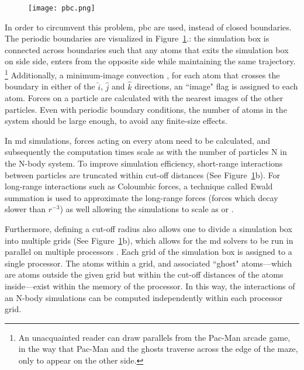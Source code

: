 \begin{figure}[!h]
	\texttt{[image: pbc.png]}
	\label{f:pbc}
\end{figure}

In order to circumvent this problem, \gls{pbc} are used, instead of closed boundaries. The periodic boundaries are visualized in Figure~\ref{f:pbc}.: the simulation box is connected across boundaries such that any atoms that exits the simulation box on side side, enters from the opposite side while maintaining the same trajectory. \footnote{An unacquainted reader can draw parallels from the Pac-Man arcade game, in the way that Pac-Man and the ghosts traverse across the edge of the maze, only to appear on the other side.} Additionally, a minimum-image convection \cite{Frenkel1997,Lee2016}, for each atom that crosses the boundary in either of the \textbf{$\hat{i}$}, \textbf{$\hat{j}$} and \textbf{$\hat{k}$} directions, an ``image" flag is assigned to each atom. Forces on a particle are calculated with the nearest images of the other particles. Even with periodic boundary conditions, the number of atoms in the system should be large enough, to avoid any finite-size effects. \par

In \gls{md} simulations, forces acting on every atom need to be calculated, and subsequently the computation times scale as  with the number of particles N in the N-body system. To improve simulation efficiency, short-range interactions between particles are truncated within cut-off distances (See Figure~\ref{f:pbc}b). For long-range interactions such as Coloumbic forces, a technique called Ewald summation is used to approximate the long-range forces (forces which decay slower than $r^{-3}$) as well allowing the simulations to scale as  or  \cite{Lee2016,Frenkel1997}. \par

Furthermore, defining a cut-off radius also allows one to divide a simulation box into multiple grids (See Figure~\ref{f:pbc}b), which allows for the \gls{md} solvers to be run in parallel on multiple processors \cite{Thompson2022}. Each grid of the simulation box is assigned to a single processor. The atoms within a grid, and associated ``ghost" atoms---which are atoms outside the given grid but within the cut-off distances of the atoms inside---exist within the memory of the processor. In this way, the interactions of an N-body simulations can be computed independently within each processor grid. \par

